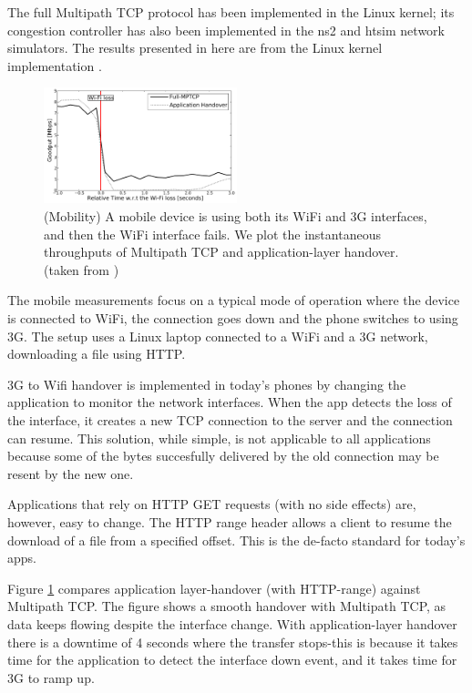 The full Multipath TCP protocol has been implemented in the Linux
kernel; its congestion controller has also been implemented in the ns2
and htsim network simulators. The results presented in here are from
the Linux kernel implementation \cite{raiciu2012hard}. 

\begin{figure}[t]
\centering
\includegraphics[width=0.5\textwidth]{figures/figure2}
\caption{(Mobility) A mobile device is using both its WiFi and 3G interfaces, and then the WiFi
interface fails. We plot the instantaneous throughputs of Multipath TCP and application-layer
handover. (taken from \cite{Paasch_Mobile:2012})} 
\label{fig:mptcp2}
\end{figure}

The mobile measurements focus on a typical mode of operation where the device is 
connected to WiFi, the connection goes down and the phone switches to using 3G. 
The setup uses a Linux laptop connected to a WiFi and a 3G network, downloading a 
file using HTTP. 

3G to Wifi handover is implemented in today's phones by changing the application to monitor
the network interfaces. When the app detects the loss of the interface, it creates a new TCP connection 
to the server and the connection can resume. This solution, while simple, is not applicable to all applications
because some of the bytes succesfully delivered by the old connection may be resent by the new one.

Applications that rely on HTTP GET requests (with no side effects) are, however, easy to change. The 
HTTP range header allows a client to resume the download of a file from a specified offset. This is the de-facto
standard for today's apps.  

Figure \ref{fig:mptcp2} compares application layer-handover (with HTTP-range) against Multipath TCP.
The figure shows a 
smooth handover with Multipath TCP, as data keeps flowing despite the interface 
change. With application-layer handover there is a downtime of 4 seconds where the transfer 
stops-this is because it takes time for the application to detect the interface down 
event, and it takes time for 3G to ramp up. 

